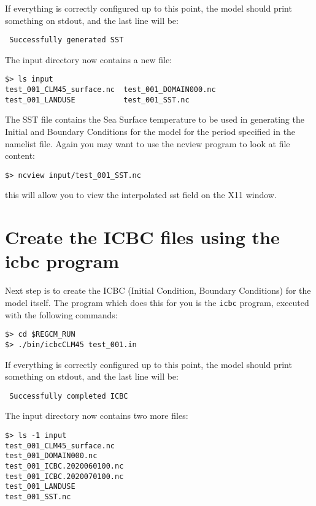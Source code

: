 If everything is correctly configured up to this point, the model should print
something on stdout, and the last line will be:

\begin{Verbatim}
 Successfully generated SST
\end{Verbatim}

The input directory now contains a new file:

\begin{Verbatim}
$> ls input
test_001_CLM45_surface.nc  test_001_DOMAIN000.nc
test_001_LANDUSE           test_001_SST.nc
\end{Verbatim}

The SST file contains the Sea Surface temperature to be used in generating the
Initial and Boundary Conditions for the model for the period specified in the
namelist file. Again you may want to use the ncview program to look at
file content:

\begin{Verbatim}
$> ncview input/test_001_SST.nc
\end{Verbatim}

this will allow you to view the interpolated sst field on the X11 window.

\section{Create the ICBC files using the icbc program}

Next step is to create the ICBC (Initial Condition, Boundary Conditions) for
the model itself. The program which does this for you is the \verb=icbc=
program, executed with the following commands:

\begin{Verbatim}
$> cd $REGCM_RUN
$> ./bin/icbcCLM45 test_001.in
\end{Verbatim}

If everything is correctly configured up to this point, the model should print
something on stdout, and the last line will be:

\begin{Verbatim}
 Successfully completed ICBC
\end{Verbatim}

The input directory now contains two more files:

\begin{Verbatim}
$> ls -1 input
test_001_CLM45_surface.nc
test_001_DOMAIN000.nc
test_001_ICBC.2020060100.nc
test_001_ICBC.2020070100.nc
test_001_LANDUSE
test_001_SST.nc
\end{Verbatim}

